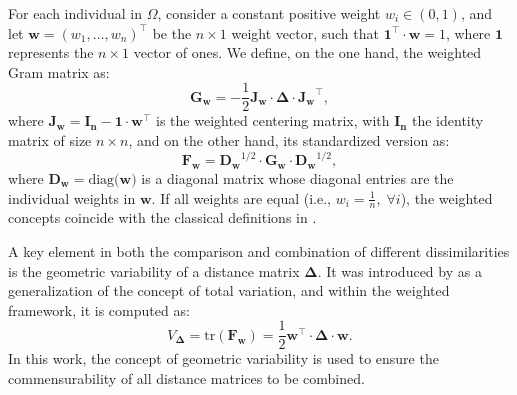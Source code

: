 For each individual in $\Omega$, consider a constant positive weight $w_i \in \left ( 0,1 \right )$, and let $\mathbf{w} = \left ( w_1,\dots,w_n \right )^\top$ be the $n \times 1$ weight vector, such that $\mathbf{1}^\top \cdot \mathbf{w} = 1$, where $\mathbf{1}$ represents the $n \times 1$ vector of ones.
We define, on the one hand, the weighted Gram matrix as:
\begin{equation}
\label{eq:Gram}
\mathbf{G_w} = -\frac{1}{2} \mathbf{J_w} \cdot \mathbf{\Delta} \cdot \mathbf{J_w}^\top,
\end{equation}
where $\mathbf{J_w} = \mathbf{I_n}- \mathbf{1} \cdot \mathbf{w}^\top$ is the weighted centering matrix, with $\mathbf{I_n}$ the identity matrix of size $n \times n$, and on the other hand, its standardized version as:
\begin{equation} 
\label{eq:standardGram}
    \mathbf{F_w} = \mathbf{D_w}^{1/2} \cdot \mathbf{G_w} \cdot \mathbf{D_w}^{1/2},
\end{equation}
where $\mathbf{D_w} = \text{diag($\mathbf{w}$)}$ is a diagonal matrix whose diagonal entries are the individual weights in $\mathbf{w}$. If all weights are equal (i.e., $w_i = \frac{1}{n}, \; \forall i$), the weighted concepts coincide with the classical definitions in \cite{borg2005modern}.

A key element in both the comparison and combination of different dissimilarities is the geometric variability of a distance matrix $\mathbf{\Delta}$. It was introduced by \cite{cuadras1995continuous} as a generalization of the concept of total variation, and within the weighted framework, it is computed as: 
\begin{equation} \label{eq:geomvar}
    V_\mathbf{\Delta} = \text{tr}(\mathbf{F_w}) = \frac{1}{2} \mathbf{w}^\top \cdot \mathbf{\Delta} \cdot \mathbf{w}.
\end{equation}
In this work, the concept of geometric variability is used to ensure the commensurability of all distance matrices to be combined.

